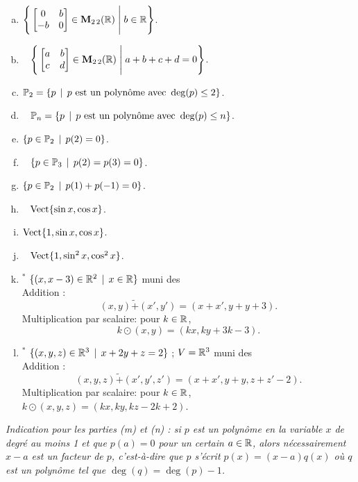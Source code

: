 \begin{prob}
\begin{enumerate}[(a)]
\item  $\Bigg\{  \bmatrix 0&b\\ -b&0\endbmatrix \in \M_{2 \,2}(\R) \;\Bigg|\; b \in \R\Bigg\}$.      \medskip


\item\sov~ $\Bigg\{  \bmatrix a&b\\ c&d\endbmatrix \in \M_{2 \,2}(\R) \;\Bigg|\; a+b+c+d=0\Bigg\}$.      \medskip

\item  $ \PP_2=\set{p\st p \text{ est un polyn\^ome avec } \deg(p)\le 2} $.  \medskip

\item\sov~ $ \PP_n=\set{p\st p \text{ est un polyn\^ome avec } \deg(p)\le n} $.  \medskip

\item  $ \set{p \in \PP_2 \st  p(2)=0}$.  \medskip


\item\sov~ $ \set{p \in \PP_3 \st  p(2)=p(3)=0}$.  \medskip



\item  $ \set{p \in \PP_2 \st  p(1)+p(-1)=0}$.      \medskip

\item\sov~ $ \sp{\sin x, \cos x}$.      \medskip

\item  $ \sp{1, \sin x, \cos x}$.      \medskip

 \item\sov~ $ \sp{1, \sin^2 x, \cos^2 x}$.      \medskip


\item$^\ast$  $\set{(x, x-3) \in \R^2\st x\in \R}$ muni des  \\
Addition : $$(x,y) \tilde+ (x',y')=(x+x', y+y +3).$$
Multiplication par scalaire: pour $k\in \R$,
$$k \odot (x,y)=(kx, ky+3k-3).$$

\item$^\ast$ $\set{(x, y, z) \in \R^3\st x+2y+z=2 }$ ; $V=\R^3$ muni des  \\
Addition : $$(x,y,z) \tilde+ (x',y',z')=(x+x', y+y,z+z'-2).$$
Multiplication par scalaire: pour $k\in \R$,  $k\odot (x,y,z)=(kx, ky, kz-2k+2)$.\medskip

\end{enumerate}
{\it Indication pour les parties (m) et (n) :  si $p$ est un polynôme en la variable $x$ de degré au moins 1 et que $p(a)=0$ pour un certain $a \in \R$, alors nécessairement $x-a$  est un facteur de $p$, c'est-à-dire que $p$ s'écrit $p(x)=(x-a)q(x)$ où $q$ est un polynôme tel que $\deg(q)=\deg(p)-1$.}



\end{prob}
